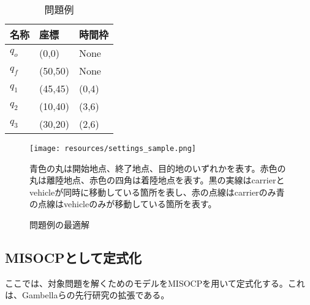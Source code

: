\documentclass[11pt,a4paper,dvipdfmx,titlepage,uplatex]{jsarticle}
\theoremstyle{mystyle}
\newcommand{\0}{\mathbf{0}}
\begin{document}
	\begin{table}[htbp]
		\centering
		\caption{問題例}
		\begin{tabular}{l|l|l}
			名称 & 座標 & 時間枠 \\ \hline\hline
			$q_o$ & (0,0) & None \\
			$q_f$ & (50,50) & None \\ \hline
			$q_1$ & (45,45) & (0,4) \\
			$q_2$ & (10,40) & (3,6) \\
			$q_3$ & (30,20) & (2,6) \\ \hline \hline
		\end{tabular}
		\label{tb:settings_sample}
	\end{table}
	\begin{figure}[htbp]
		\centering
		\texttt{[image: resources/settings\_sample.png]}
		\caption{問題例の最適解}
		\begin{minipage}[c]{0.7\hsize}
			青色の丸は開始地点、終了地点、目的地のいずれかを表す。赤色の丸は離陸地点、赤色の四角は着陸地点を表す。黒の実線はcarrierとvehicleが同時に移動している箇所を表し、赤の点線はcarrierのみ青の点線はvehicleのみが移動している箇所を表す。
		\end{minipage}
		\label{fig:settings_sample}
	\end{figure}
	
	\subsection{MISOCPとして定式化}\label{sec:formulation_as_MISOCP}
	ここでは、対象問題を解くためのモデルをMISOCPを用いて定式化する。これは、Gambellaらの先行研究\cite{gambella2018exact}の拡張である。
	
\end{document}
